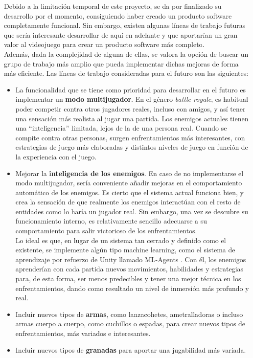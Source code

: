 Debido a la limitación temporal de este proyecto, se da por finalizado su desarrollo por el momento, consiguiendo haber creado un producto software completamente funcional.
Sin embargo, existen algunas líneas de trabajo futuras que sería interesante desarrollar de aquí en adelante y que aportarían un gran valor al videojuego para crear un producto software más completo.\\ Además, dada la complejidad de alguna de ellas, se valora la opción de buscar un grupo de trabajo más amplio que pueda implementar dichas mejoras de forma más eficiente. Las líneas de trabajo consideradas para el futuro son las siguientes:
\begin{itemize}
    \item La funcionalidad que se tiene como prioridad para desarrollar en el futuro es implementar un \textbf{modo multijugador}. En el género \textit{battle royale}, es habitual poder competir contra otros jugadores reales, incluso con amigos, y así tener una sensación más realista al jugar una partida. Los enemigos actuales tienen una “inteligencia” limitada, lejos de la de una persona real. Cuando se compite contra otras personas, surgen enfrentamientos más interesantes, con estrategias de juego más elaboradas y distintos niveles de juego en función de la experiencia con el juego.
    \item Mejorar la \textbf{inteligencia de los enemigos}. En caso de no implementarse el modo multijugador, sería conveniente añadir mejoras en el comportamiento automático de los enemigos. Es cierto que el sistema actual funciona bien, y crea la sensación de que realmente los enemigos interactúan con el resto de entidades como lo haría un jugador real. Sin embargo, una vez se descubre su funcionamiento interno, es relativamente sencillo adecuarse a su comportamiento para salir victorioso de los enfrentamientos.\\
    Lo ideal es que, en lugar de un sistema tan cerrado y definido como el existente, se implemente algún tipo machine learning, como el sistema de aprendizaje por refuerzo de Unity llamado ML-Agents \cite{wiki:MLAgents}. Con él, los enemigos aprenderían con cada partida nuevos movimientos, habilidades y estrategias para, de esta forma, ser menos predecibles y tener una mejor técnica en los enfrentamientos, dando como resultado un nivel de inmersión más profundo y real.
    \item Incluir nuevos tipos de \textbf{armas}, como lanzacohetes, ametralladoras o incluso armas cuerpo a cuerpo, como cuchillos o espadas, para crear nuevos tipos de enfrentamientos, más variados e interesantes.
    \item Incluir nuevos tipos de \textbf{granadas} para aportar una jugabilidad más variada.
    

\end{itemize}
